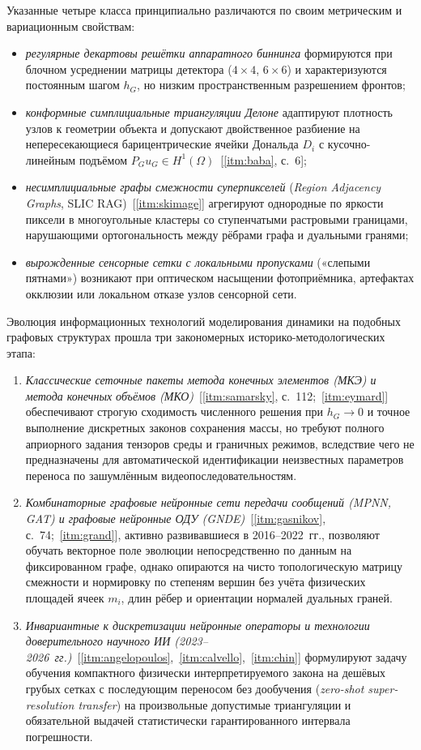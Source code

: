 Указанные четыре класса принципиально различаются по своим метрическим и вариационным свойствам:
\begin{itemize}
    \item \emph{регулярные декартовы решётки аппаратного биннинга} формируются при блочном усреднении матрицы детектора ($4\times 4$, $6\times 6$) и характеризуются постоянным шагом $h_G$, но низким пространственным разрешением фронтов;
    \item \emph{конформные симплициальные триангуляции Делоне} адаптируют плотность узлов к геометрии объекта и допускают двойственное разбиение на непересекающиеся барицентрические ячейки Дональда $D_i$ с кусочно-линейным подъёмом $P_G u_G \in H^1(\Omega)$~[\ref{itm:baba}, с.~6];
    \item \emph{несимплициальные графы смежности суперпикселей} (\emph{Region Adjacency Graphs}, SLIC RAG)~[\ref{itm:skimage}] агрегируют однородные по яркости пиксели в многоугольные кластеры со ступенчатыми растровыми границами, нарушающими ортогональность между рёбрами графа и дуальными гранями;
    \item \emph{вырожденные сенсорные сетки с локальными пропусками} («слепыми пятнами») возникают при оптическом насыщении фотоприёмника, артефактах окклюзии или локальном отказе узлов сенсорной сети.
\end{itemize}

Эволюция информационных технологий моделирования динамики на подобных графовых структурах прошла три закономерных историко-методологических этапа:
\begin{enumerate}
    \item \emph{Классические сеточные пакеты метода конечных элементов (МКЭ) и метода конечных объёмов (МКО)}~[\ref{itm:samarsky}, с.~112;~\ref{itm:eymard}] обеспечивают строгую сходимость численного решения при $h_G\to 0$ и точное выполнение дискретных законов сохранения массы, но требуют полного априорного задания тензоров среды и граничных режимов, вследствие чего не предназначены для автоматической идентификации неизвестных параметров переноса по зашумлённым видеопоследовательностям.
    \item \emph{Комбинаторные графовые нейронные сети передачи сообщений (MPNN, GAT) и графовые нейронные ОДУ (GNDE)}~[\ref{itm:gasnikov}, с.~74;~\ref{itm:grand}], активно развивавшиеся в 2016--2022~гг., позволяют обучать векторное поле эволюции непосредственно по данным на фиксированном графе, однако опираются на чисто топологическую матрицу смежности и нормировку по степеням вершин без учёта физических площадей ячеек $m_i$, длин рёбер и ориентации нормалей дуальных граней.
    \item \emph{Инвариантные к дискретизации нейронные операторы и технологии доверительного научного ИИ (2023--2026~гг.)}~[\ref{itm:angelopoulos},~\ref{itm:calvello},~\ref{itm:chin}] формулируют задачу обучения компактного физически интерпретируемого закона на дешёвых грубых сетках с последующим переносом без дообучения (\emph{zero-shot super-resolution transfer}) на произвольные допустимые триангуляции и обязательной выдачей статистически гарантированного интервала погрешности.
\end{enumerate}

